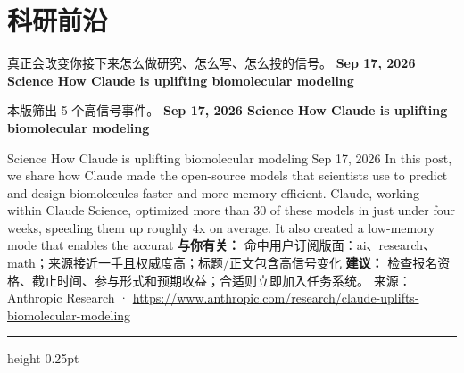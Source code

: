 \documentclass[10.5pt]{ctexart}
\begin{document}
\section*{科研前沿}
{\color{ormuted} 真正会改变你接下来怎么做研究、怎么写、怎么投的信号。}
\vspace{2mm}
{\LARGE\bfseries Sep 17, 2026 Science How Claude is uplifting biomolecular modeling}\par
\vspace{1mm}
{\color{ormuted} 本版筛出 5 个高信号事件。}
\vspace{3mm}
{\Large\bfseries Sep 17, 2026 Science How Claude is uplifting biomolecular modeling}\par
Science How Claude is uplifting biomolecular modeling Sep 17, 2026 In this post, we share how Claude made the open-source models that scientists use to predict and design biomolecules faster and more memory-efficient. Claude, working within Claude Science, optimized more than 30 of these models in just under four weeks, speeding them up roughly 4x on average. It also created a low-memory mode that enables the accurat
\textbf{与你有关：} 命中用户订阅版面：ai、research、math；来源接近一手且权威度高；标题/正文包含高信号变化
\textbf{建议：} 检查报名资格、截止时间、参与形式和预期收益；合适则立即加入任务系统。
{\footnotesize\color{ormuted} 来源：Anthropic Research · \url{https://www.anthropic.com/research/claude-uplifts-biomolecular-modeling}}
\vspace{4mm}
\hrule height 0.25pt
\vspace{3mm}
\end{document}
